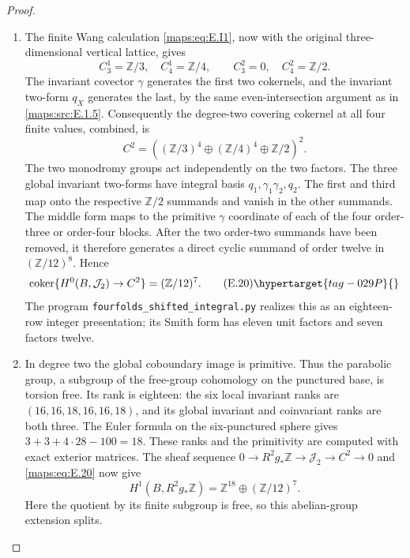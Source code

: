 \begin{proof}
\begin{enumerate}[label={$\langle1\rangle$\arabic*.},leftmargin=*]
\item The finite Wang calculation \eqref{maps:eq:E.I1}, now with the original
three-dimensional vertical lattice, gives
\[
 C_3^1=\mathbb Z/3,\quad C_4^1=\mathbb Z/4,
 \qquad C_3^2=0,\quad C_4^2=\mathbb Z/2.
\]
The invariant covector \(\gamma\) generates the first two
cokernels, and the invariant two-form \(q_X\) generates the
last, by the same even-intersection argument as in \ref{maps:src:E.1.5}.
Consequently the degree-two covering cokernel at all four
finite values, combined, is
\[
 C^2=\left((\mathbb Z/3)^4\oplus
                 (\mathbb Z/4)^4\oplus\mathbb Z/2\right)^2.
\]
The two monodromy groups act independently on the two factors.
The three global invariant two-forms have integral basis
\(q_1,\gamma_1\gamma_2,q_2\). The first and third map
onto the respective \(\mathbb Z/2\) summands and vanish
in the other summands. The middle form maps to the primitive
\(\gamma\) coordinate of each of the four order-three or
order-four blocks. After the two order-two summands have
been removed, it therefore generates a direct cyclic summand
of order twelve in \((\mathbb Z/12)^8\). Hence
\[
 \operatorname{coker}\{H^0(B,\mathcal J_2)\to C^2\}
      =(\mathbb Z/12)^7.
 \tag{E.20}\hypertarget{tag-029P}{}\label{maps:eq:E.20}
\]
The program \texttt{fourfolds\_shifted\_integral.py} realizes
this as an eighteen-row integer presentation; its Smith form
has eleven unit factors and seven factors twelve.

\item In degree two the global coboundary image is primitive.
Thus the parabolic group, a subgroup of the free-group
cohomology on the punctured base, is torsion free. Its rank
is eighteen: the six local invariant ranks are
\((16,16,18,16,16,18)\), and its global invariant and
coinvariant ranks are both three. The Euler formula on the
six-punctured sphere gives \(3+3+4\cdot28-100=18\).
These ranks and the primitivity are computed with exact exterior matrices. The sheaf sequence
\(0\to R^2g_*\mathbb Z\to\mathcal J_2\to C^2\to0\)
and \eqref{maps:eq:E.20} now give
\[
 H^1(B,R^2g_*\mathbb Z)
     =\mathbb Z^{18}\oplus(\mathbb Z/12)^7.
\]
Here the quotient by its finite subgroup is free, so this
abelian-group extension splits.


\end{enumerate}
\end{proof}
